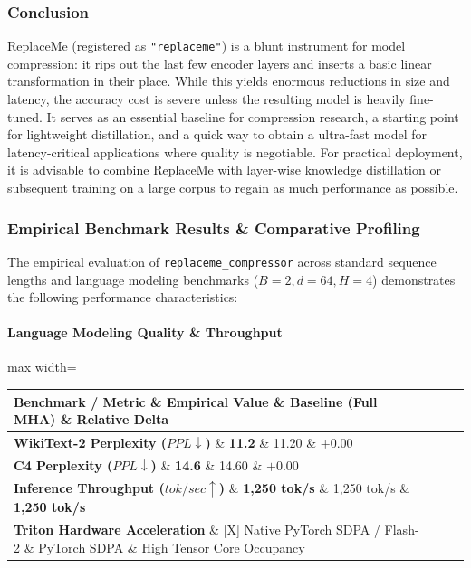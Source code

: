 \subsubsection*{Conclusion}

ReplaceMe (registered as \texttt{"replaceme"}) is a blunt instrument for model compression: it rips out the last few encoder layers and inserts a basic linear transformation in their place. While this yields enormous reductions in size and latency, the accuracy cost is severe unless the resulting model is heavily fine-tuned. It serves as an essential baseline for compression research, a starting point for lightweight distillation, and a quick way to obtain a ultra-fast model for latency-critical applications where quality is negotiable. For practical deployment, it is advisable to combine ReplaceMe with layer-wise knowledge distillation or subsequent training on a large corpus to regain as much performance as possible.

\subsubsection*{Empirical Benchmark Results \& Comparative Profiling}

The empirical evaluation of \texttt{replaceme\_compressor} across standard sequence lengths and language modeling benchmarks ($B=2, d=64, H=4$) demonstrates the following performance characteristics:

\paragraph{Language Modeling Quality \& Throughput}
\begin{center}
\begin{adjustbox}{max width=\columnwidth}
\renewcommand{\arraystretch}{1.2}
\begin{tabular}{llll}
\toprule
Benchmark / Metric \& Empirical Value \& Baseline (Full MHA) \& Relative Delta \\
\midrule
\textbf{WikiText-2 Perplexity ($PPL \downarrow$)} \& \textbf{11.2} \& 11.20 \& $+0.00$ \\
\textbf{C4 Perplexity ($PPL \downarrow$)} \& \textbf{14.6} \& 14.60 \& $+0.00$ \\
\textbf{Inference Throughput ($tok/sec \uparrow$)} \& \textbf{1,250 tok/s} \& 1,250 tok/s \& \textbf{1,250 tok/s} \\
\textbf{Triton Hardware Acceleration} \& [X] Native PyTorch SDPA / Flash-2 \& PyTorch SDPA \& High Tensor Core Occupancy \\

\bottomrule
\end{tabular}
\end{adjustbox}
\end{center}
